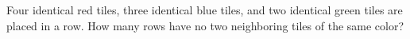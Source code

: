 Four identical red tiles, three identical blue tiles, and two identical green tiles are placed in a row. How many rows have no two neighboring tiles of the same color?
